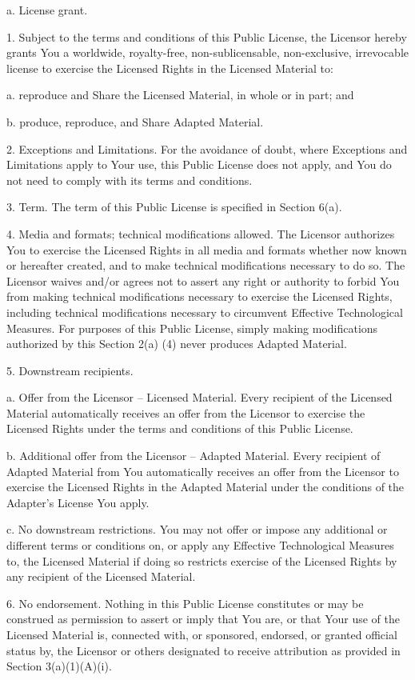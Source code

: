 a. License grant. \begin{DoxyVerb} 1. Subject to the terms and conditions of this Public License,
    the Licensor hereby grants You a worldwide, royalty-free,
    non-sublicensable, non-exclusive, irrevocable license to
    exercise the Licensed Rights in the Licensed Material to:

      a. reproduce and Share the Licensed Material, in whole or
         in part; and

      b. produce, reproduce, and Share Adapted Material.

 2. Exceptions and Limitations. For the avoidance of doubt, where
    Exceptions and Limitations apply to Your use, this Public
    License does not apply, and You do not need to comply with
    its terms and conditions.

 3. Term. The term of this Public License is specified in Section
    6(a).

 4. Media and formats; technical modifications allowed. The
    Licensor authorizes You to exercise the Licensed Rights in
    all media and formats whether now known or hereafter created,
    and to make technical modifications necessary to do so. The
    Licensor waives and/or agrees not to assert any right or
    authority to forbid You from making technical modifications
    necessary to exercise the Licensed Rights, including
    technical modifications necessary to circumvent Effective
    Technological Measures. For purposes of this Public License,
    simply making modifications authorized by this Section 2(a)
    (4) never produces Adapted Material.

 5. Downstream recipients.

      a. Offer from the Licensor -- Licensed Material. Every
         recipient of the Licensed Material automatically
         receives an offer from the Licensor to exercise the
         Licensed Rights under the terms and conditions of this
         Public License.

      b. Additional offer from the Licensor -- Adapted Material.
         Every recipient of Adapted Material from You
         automatically receives an offer from the Licensor to
         exercise the Licensed Rights in the Adapted Material
         under the conditions of the Adapter's License You apply.

      c. No downstream restrictions. You may not offer or impose
         any additional or different terms or conditions on, or
         apply any Effective Technological Measures to, the
         Licensed Material if doing so restricts exercise of the
         Licensed Rights by any recipient of the Licensed
         Material.

 6. No endorsement. Nothing in this Public License constitutes or
    may be construed as permission to assert or imply that You
    are, or that Your use of the Licensed Material is, connected
    with, or sponsored, endorsed, or granted official status by,
    the Licensor or others designated to receive attribution as
    provided in Section 3(a)(1)(A)(i).
\end{DoxyVerb}

